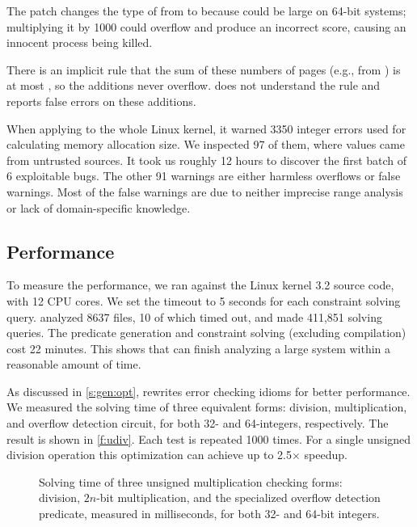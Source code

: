 The patch changes the type of  from  to  because
 could be large on 64-bit systems; multiplying it by
1000 could overflow and produce an incorrect score,
causing an innocent process being killed.

There is an implicit rule that the sum of these numbers of pages
(e.g., from ) is at most , so the
additions never overflow.  \sys does not understand the rule and
reports false errors on these additions.

When applying \sys to the whole Linux kernel,
it warned 3350 integer errors used for calculating
memory allocation size.  We inspected 97 of them,
where values came from untrusted sources. It took us roughly 12
hours to discover the first batch of 6 exploitable bugs.
The other 91 warnings are either harmless overflows or false warnings.
Most of the false warnings are due to neither imprecise range analysis
or lack of domain-specific knowledge.


\subsection{Performance}
\label{s:eval:perf}

To measure the performance, we ran \sys against the Linux kernel
3.2 source code, with 12 CPU cores.  We set the timeout
to 5 seconds for each constraint solving query.   \sys analyzed
8637 files, 10 of which timed out, and made 411,851 solving queries.
The predicate generation and constraint solving (excluding compilation)
cost 22 minutes.  This shows that \sys can finish analyzing a large
system within a reasonable amount of time.

As discussed in \autoref{s:gen:opt}, \sys rewrites error checking
idioms for better performance.  We measured the solving time of three
equivalent forms: division, multiplication, and overflow detection
circuit, for both 32- and 64-integers, respectively.  The result
is shown in \autoref{f:udiv}.  Each test is repeated 1000 times.
For a single unsigned division operation this optimization can
achieve up to 2.5$\times$ speedup.

\begin{figure}
\centering

\caption{Solving time of three unsigned multiplication checking forms:
division, $2n$-bit multiplication, and the specialized overflow
detection predicate, measured in milliseconds, for both 32- and 64-bit
integers.}
\label{f:udiv}
\end{figure}
